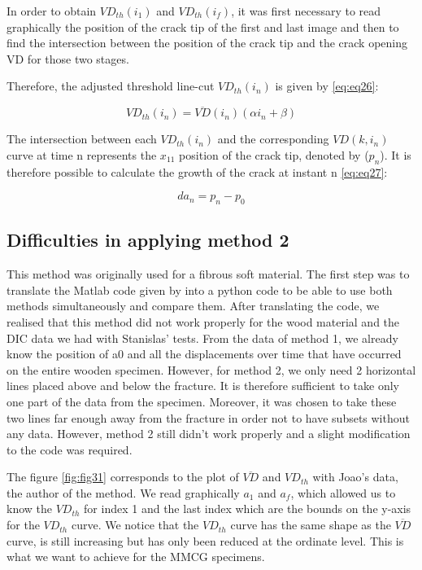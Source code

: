In order to obtain $VD_{th}(i_1)$ and $VD_{th}(i_f)$, it was first necessary to read graphically the position of the crack tip of the first and last image and then to find the intersection between the position of the crack tip and the crack opening VD for those two stages.

Therefore, the adjusted threshold line-cut $VD_{th}(i_n)$ is given by \ref{eq:eq26}:

\begin{equation}
	VD_{th}(i_n)=\overline{VD}(i_n)(\alpha i_n +\beta)
	\label{eq:eq26}
\end{equation}

The intersection between each $VD_{th}(i_n)$ and the corresponding $VD(k, i_n)$ curve at time n represents the $x_{11}$ position of the crack tip, denoted by ($p_n$).
It is therefore possible to calculate the growth of the crack at instant n \ref{eq:eq27}:

\begin{equation}
	da_n=p_n-p_0
	\label{eq:eq27}
\end{equation}

\subsection{Difficulties in applying method 2}

This method was originally used for a fibrous soft material. The first step was to translate the Matlab code given by \cite{FilhoJ2022} into a python code to be able to use both methods simultaneously and compare them.
After translating the code, we realised that this method did not work properly for the wood material and the DIC data we had with Stanislas' tests.
From the data of method 1, we already know the position of a0 and all the displacements over time that have occurred on the entire wooden specimen. However, for method 2, we only need 2 horizontal lines placed above and below the fracture. It is therefore sufficient to take only one part of the data from the specimen. Moreover, it was chosen to take these two lines far enough away from the fracture in order not to have subsets without any data.
However, method 2 still didn't work properly and a slight modification to the code was required.

The figure \ref{fig:fig31} corresponds to the plot of $\overline{VD}$ and $VD_{th}$ with Joao's data, the author of the method. We read graphically $a_1$ and $a_f$, which allowed us to know the $VD_{th}$ for index 1 and the last index which are the bounds on the y-axis for the $VD_{th}$ curve. We notice that the $VD_{th}$ curve has the same shape as the $\overline{VD}$ curve, is still increasing but has only been reduced at the ordinate level. This is what we want to achieve for the MMCG specimens.

